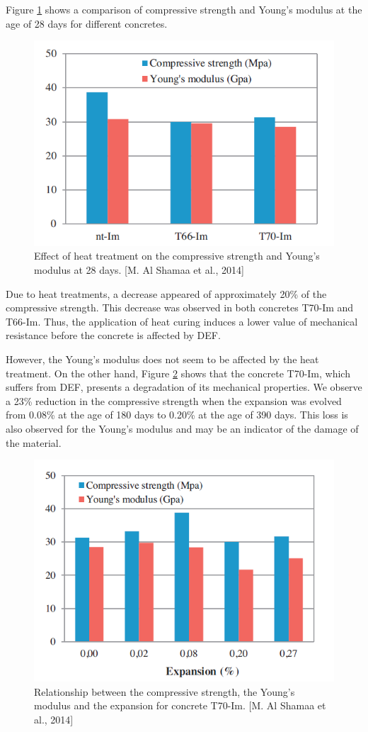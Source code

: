 Figure \ref{Shamaa_2} shows a comparison of compressive strength and Young’s modulus at the age of 28 days for different concretes.

\begin{figure}[h!]
  \centering
  \includegraphics[width=0.8\linewidth]{Reference/Shamaa2.png}
  \caption{Effect of heat treatment on the compressive strength and Young’s modulus
at 28 days. [M. Al Shamaa et al., 2014]}
  \label{Shamaa_2}
\end{figure}

Due to heat treatments, a decrease appeared of approximately 20\% of the compressive strength. This decrease was observed in both concretes T70-Im and T66-Im. Thus, the application of heat curing induces a lower value of mechanical resistance before the concrete is affected by DEF.

However, the Young’s modulus does not seem to be affected by the heat treatment. On the other hand, Figure \ref{Shamaa_3} shows that the concrete T70-Im, which suffers from DEF, presents a degradation of its mechanical properties. We observe a 23\% reduction in the compressive strength when the expansion was evolved from 0.08\% at the age of 180 days to 0.20\% at the age of 390 days. This loss is also observed for the Young’s modulus and may be an indicator of the damage of the material.

\begin{figure}[h!]
  \centering
  \includegraphics[width=0.8\linewidth]{Reference/Shamaa3.png}
  \caption{Relationship between the compressive strength, the Young’s modulus and
the expansion for concrete T70-Im. [M. Al Shamaa et al., 2014]}
  \label{Shamaa_3}
\end{figure}

